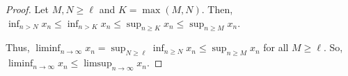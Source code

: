 \documentclass{report}
\begin{document}

\begin{proof}
    Let $M,N \geq \ell$ and $K = \max(M,N)$. Then, $\inf_{n > N} x_n \leq \inf_{n > K} x_n \leq \sup_{n \geq K} x_n \leq \sup_{n \geq M} x_n$.

    Thus, $\liminf_{n \to \infty} x_n  = \sup_{N \geq \ell} \inf_{n \geq N} x_n \leq \sup_{n \geq M} x_n$ for all $M \geq \ell$. So, $\liminf_{n \to \infty} x_n \leq \limsup_{n \to \infty} x_n$.
\end{proof}
\end{document}
